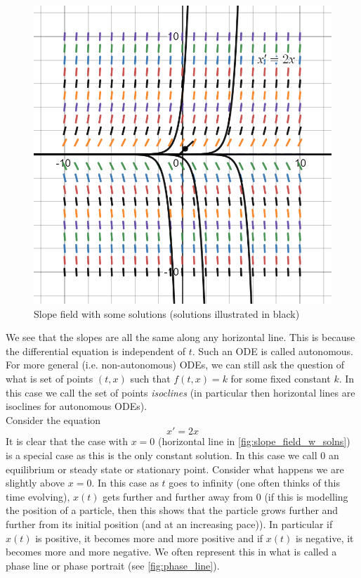 \begin{figure}[ht]
    \centering
    \includegraphics[scale=0.3]{Images/slope_field_with_solns.png}
    \caption{Slope field with some solutions (solutions illustrated in black)}
    \label{fig:slope_field_w_solns}
\end{figure}

We see that the slopes are all the same along any horizontal line. This is because the differential equation is independent of $t$. Such an ODE is called autonomous. For more general (i.e. non-autonomous) ODEs, we can still ask the question of what is set of points $(t, x)$ such that $f(t, x) = k$ for some fixed constant $k$. In this case we call the set of points \textit{isoclines} (in particular then horizontal lines are isoclines for autonomous ODEs).\\

Consider the equation 
$$ x' = 2x $$
It is clear that the case with $x = 0$ (horizontal line in \autoref{fig:slope_field_w_solns}) is a special case as this is the only constant solution. In this case we call $0$ an equilibrium or steady state or stationary point. Consider what happens we are slightly above $x = 0$. In this case as $t$ goes to infinity (one often thinks of this time evolving), $x(t)$ gets further and further away from 0 (if this is modelling the position of a particle, then this shows that the particle grows further and further from its initial position (and at an increasing pace)). In particular if $x(t)$ is positive, it becomes more and more positive and if $x(t)$ is negative, it becomes more and more negative. We often represent this in what is called a phase line or phase portrait (see \autoref{fig:phase_line}).

